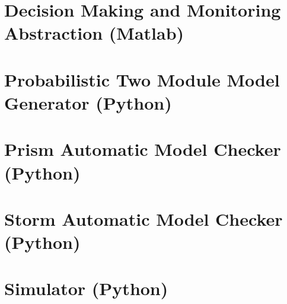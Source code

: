 

\section{Decision Making and Monitoring Abstraction (Matlab)}
\label{sec:dm_abs}



\section{Probabilistic Two Module Model Generator (Python)}
\label{sec:two_module_gen}



\section{Prism Automatic Model Checker (Python)}



\section{Storm Automatic Model Checker (Python)}



\section{Simulator (Python)}
\label{sec:sim-app}





